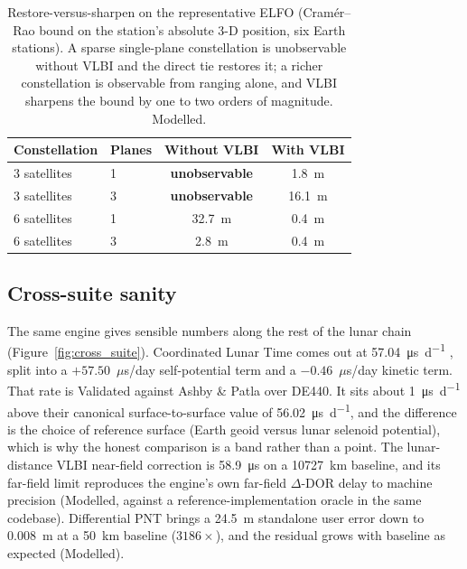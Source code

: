 \begin{table}[t]
\centering
\small
\begin{tabular}{@{}llcc@{}}
\toprule
Constellation & Planes & Without VLBI & With VLBI \\
\midrule
3 satellites & 1 & \textbf{unobservable} & \SI{1.8}{\meter} \\
3 satellites & 3 & \textbf{unobservable} & \SI{16.1}{\meter} \\
6 satellites & 1 & \SI{32.7}{\meter} & \SI{0.4}{\meter} \\
6 satellites & 3 & \SI{2.8}{\meter}  & \SI{0.4}{\meter} \\
\bottomrule
\end{tabular}
\caption{Restore-versus-sharpen on the representative ELFO (Cram\'er--Rao bound on the
station's absolute 3-D position, six Earth stations). A sparse single-plane constellation is
unobservable without VLBI and the direct tie restores it; a richer constellation is
observable from ranging alone, and VLBI sharpens the bound by one to two orders of
magnitude. Modelled.}
\label{tab:elfo}
\end{table}

\subsection{Cross-suite sanity}

The same engine gives sensible numbers along the rest of the lunar chain
(Figure~\ref{fig:cross_suite}). Coordinated Lunar Time comes out at
\SI{57.04}{\micro\second\per\day} \citep{ashby2024lunartime,iau2024lcrs}, split
into a $+57.50$~$\mu$s/day self-potential term and a $-0.46$~$\mu$s/day kinetic
term. That rate is Validated against Ashby \& Patla over DE440. It sits about
\SI{1}{\micro\second\per\day} above their canonical surface-to-surface value of
\SI{56.02}{\micro\second\per\day}, and the difference is the choice of reference
surface (Earth geoid versus lunar selenoid potential), which is why the honest
comparison is a band rather than a point. The lunar-distance VLBI near-field
correction is \SI{58.9}{\micro\second} on a \SI{10727}{\kilo\meter} baseline, and
its far-field limit reproduces the engine's own far-field $\Delta$-DOR delay to
machine precision (Modelled, against a reference-implementation oracle in the
same codebase). Differential PNT brings a \SI{24.5}{\meter} standalone user error
down to \SI{0.008}{\meter} at a \SI{50}{\kilo\meter} baseline ($3186\times$), and
the residual grows with baseline as expected (Modelled).

